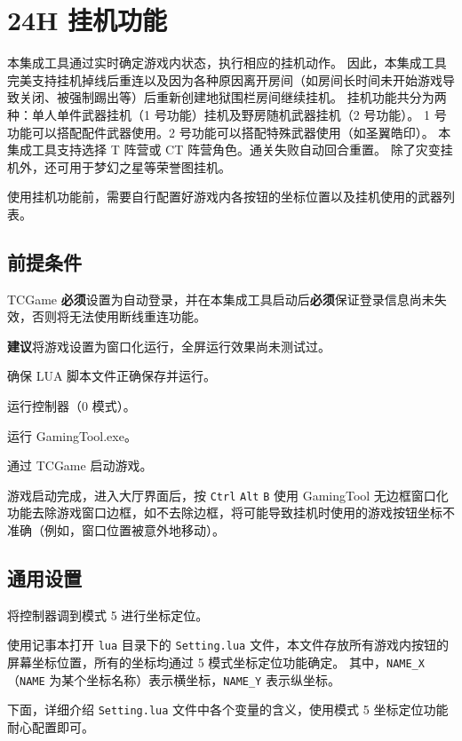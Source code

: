 \section{24H 挂机功能}

本集成工具通过实时确定游戏内状态，执行相应的挂机动作。
因此，本集成工具完美支持挂机掉线后重连以及因为各种原因离开房间（如房间长时间未开始游戏导致关闭、被强制踢出等）后重新创建地狱围栏房间继续挂机。
挂机功能共分为两种：单人单件武器挂机（1 号功能）挂机及野房随机武器挂机（2 号功能）。
1 号功能可以搭配配件武器使用。2 号功能可以搭配特殊武器使用（如圣翼皓印）。
本集成工具支持选择 T 阵营或 CT 阵营角色。通关失败自动回合重置。
除了灾变挂机外，还可用于梦幻之星等荣誉图挂机。

使用挂机功能前，需要自行配置好游戏内各按钮的坐标位置以及挂机使用的武器列表。

\subsection{前提条件}

TCGame \textbf{\color{red}必须}设置为自动登录，并在本集成工具启动后\textbf{\color{red}必须}保证登录信息尚未失效，否则将无法使用断线重连功能。

\textbf{\color{red}建议}将游戏设置为窗口化运行，全屏运行效果尚未测试过。

确保 LUA 脚本文件正确保存并运行。

运行控制器（0 模式）。

运行 GamingTool.exe。

通过 TCGame 启动游戏。

游戏启动完成，进入大厅界面后，按 \lstinline{Ctrl} \lstinline{Alt} \lstinline{B} 使用 GamingTool 无边框窗口化功能去除游戏窗口边框，如不去除边框，将可能导致挂机时使用的游戏按钮坐标不准确（例如，窗口位置被意外地移动）。

\subsection{通用设置}

将控制器调到模式 5 进行坐标定位。

使用记事本打开 \lstinline{lua} 目录下的 \lstinline{Setting.lua} 文件，本文件存放所有游戏内按钮的屏幕坐标位置，所有的坐标均通过 5 模式坐标定位功能确定。
其中，\lstinline{NAME_X}（\lstinline{NAME} 为某个坐标名称）表示横坐标，\lstinline{NAME_Y} 表示纵坐标。

下面，详细介绍 \lstinline{Setting.lua} 文件中各个变量的含义，使用模式 5 坐标定位功能耐心配置即可。


